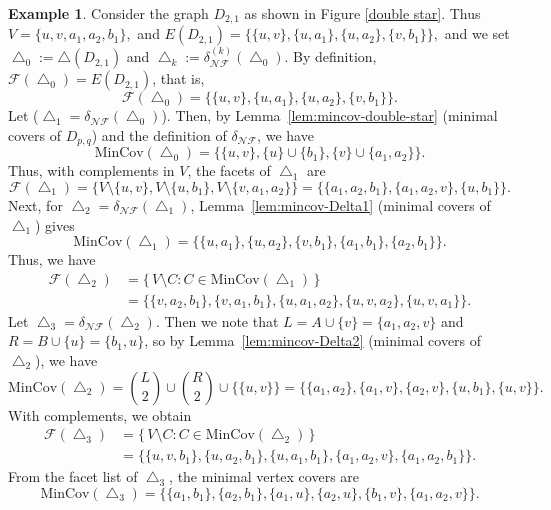\documentclass[12pt]{article}
\theoremstyle{plain}
\theoremstyle{definition}
\newtheorem{example}[theorem]{Example}
\newcommand{\F}{\mathcal{F}}
\newcommand{\MIN}{\mathrm{MinCov}}
\begin{document}
		 \begin{example}\label{ex:D21}
			Consider the graph \(D_{2,1}\) as shown in Figure \ref{double star}. Thus $V=\{u,v,a_1,a_2,b_1\},$ and $E(D_{2,1})=\bigl\{\{u,v\},\{u,a_1\},\{u,a_2\},\{v,b_1\}\bigr\},$
			and we set \(\bigtriangleup_0:=\bigtriangleup(D_{2,1})\) and \(\bigtriangleup_k:=\delta_{\mathcal{NF}}^{(k)}(\bigtriangleup_0)\).
			 By definition, \(\F(\bigtriangleup_0)=E(D_{2,1})\), that is,
			\[
			\F(\bigtriangleup_0)=\bigl\{\{u,v\},\{u,a_1\},\{u,a_2\},\{v,b_1\}\bigr\}.
			\]
			Let  (\(\bigtriangleup_1=\delta_{\mathcal{NF}}(\bigtriangleup_0)\)). Then, by Lemma~\ref{lem:mincov-double-star} (minimal covers of \(D_{p,q}\)) and the definition of \(\delta_{\mathcal{NF}}\), we have
			\[
			\MIN(\bigtriangleup_0)=\bigl\{\{u,v\},\{u\}\cup\{b_1\},\{v\}\cup\{a_1,a_2\}\bigr\}.
			\]
			Thus, with complements in \(V\),  the facets of \(\bigtriangleup_1\) are
			\[
			\F(\bigtriangleup_1)=
			\bigl\{V\setminus\{u,v\}, V\setminus\{u,b_1\}, V\setminus\{v,a_1,a_2\}\bigr\}
			=
			\bigl\{\{a_1,a_2,b_1\},\{a_1,a_2,v\},\{u,b_1\}\bigr\}.
			\]
			Next, for \(\bigtriangleup_2=\delta_{\mathcal{NF}}(\bigtriangleup_1)\), Lemma~\ref{lem:mincov-Delta1} (minimal covers of \(\bigtriangleup_1\)) gives
			\[
			\MIN(\bigtriangleup_1)=\{\{u,a_1\},\{u,a_2\},\{v,b_1\},\{a_1,b_1\},\{a_2,b_1\}\}.
			\]
			Thus, we have
			\begin{align*}
				\F(\bigtriangleup_2)
				&=\{\,V\setminus C: C\in\MIN(\bigtriangleup_1)\,\}\\
				&=\bigl\{\{v,a_2,b_1\},\{v,a_1,b_1\},\{u,a_1,a_2\},\{u,v,a_2\},\{u,v,a_1\}\bigr\}.
			\end{align*}
			Let \(\bigtriangleup_3=\delta_{\mathcal{NF}}(\bigtriangleup_2)\). Then we note that  \(L=A\cup\{v\}=\{a_1,a_2,v\}\) and \(R=B\cup\{u\}=\{b_1,u\}\), so by Lemma~\ref{lem:mincov-Delta2} (minimal covers of \(\bigtriangleup_2\)), we have
			\[
			\MIN(\bigtriangleup_2)=\binom{L}{2} \cup \binom{R}{2} \cup \{\{u,v\}\}
			=\{\{a_1,a_2\},\{a_1,v\},\{a_2,v\},\{u,b_1\},\{u,v\}\}.
			\]
			With complements, we obtain
			\begin{align*}
				\F(\bigtriangleup_3)
				&=\{\,V\setminus C: C\in\MIN(\bigtriangleup_2)\,\}\\
				&=\bigl\{\{u,v,b_1\},\{u,a_2,b_1\},\{u,a_1,b_1\},\{a_1,a_2,v\},\{a_1,a_2,b_1\}\bigr\}.
			\end{align*}
			 From the facet list of \(\bigtriangleup_3\), the minimal vertex covers are
			\[
			\MIN(\bigtriangleup_3)=\{\{a_1,b_1\},\{a_2,b_1\},\{a_1,u\},\{a_2,u\},\{b_1,v\},\{a_1,a_2,v\}\}.
\]
\end{example}
\end{document}
